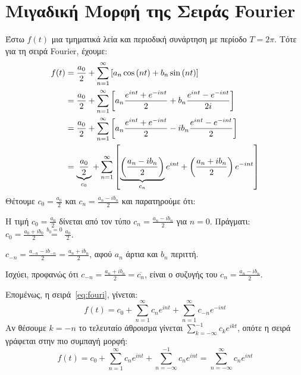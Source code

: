 \documentclass[a4paper,table]{report}
\begin{document}
      \section{Μιγαδική Μορφή της Σειράς Fourier}



      Έστω $f(t)$ μια τμηματικά λεία και περιοδική συνάρτηση με περίοδο $ T=2 \pi $. Τότε 
      για τη σειρά Fourier, έχουμε:
      \begin{align}
        \label{eq:fouri}
        f(t) &= \frac{a_{0}}{2} + \sum_{n=1}^{\infty} \left[a_{n} \cos{(nt)} + b_{n} \sin{(nt)}\right] \notag \\
             &= \frac{a_{0}}{2} + \sum_{n=1}^{\infty} \left[a_{n} \frac{e^{int}+e^{-int}}{2} + b_{n} \frac{e^{int}-e^{-int}}{2i} \right] \notag \\
             &= \frac{a_{0}}{2} + \sum_{n=1}^{\infty} \left[a_{n} \frac{e^{int}+e^{-int}}{2} - i b_{n} \frac{e^{int}-e^{-int}}{2}\right] \notag \\
             &= \underbrace{\frac{a_{0}}{2}}_{c_{0}} + \sum_{n=1}^{\infty} \left[\underbrace{\left(\frac{a_{n}-ib_{n}}{2}\right)}_{c_{n}}e^{int} +
             \left(\frac{a_{n}+ib_{n}}{2}\right) e^{-int}\right]
      \end{align}
      Θέτουμε $ c_{0} = \frac{a_{0}}{2} $ και $ c_{n} = \frac{a_{n}-ib_{n}}{2} $ και
      παρατηρούμε ότι:
      \begin{myitemize}
        \item Η τιμή $ c_{0} = \frac{a_{0}}{2} $ δίνεται από τον τύπο $ c_{n} =
          \frac{a_{n}- ib_{n}}{2} $ για $ n=0 $. Πράγματι: 
          $ c_{0} = \frac{a_{0}+ib_{0}}{2} \overset{b_{0}=0}{=} \frac{a_{0}}{2}$.
        \item 
          $ c_{-n} = \frac{a_{-n}-ib_{-n}}{2} = \frac{a_{n}+ib_{n}}{2} $, αφού 
          $ a_{n} $ άρτια και $ b_{n} $ περιττή.
        \item Ισχύει, προφανώς ότι $ c_{-n} = \frac{a_{n}+ib_{n}}{2} = \overline{c_{n}}
          $, είναι ο συζυγής του $ c_{n} = \frac{a_{n}-i b_{n}}{2} $.
      \end{myitemize}
      Επομένως, η σειρά~\eqref{eq:fouri}, γίνεται:
      \[
        f(t) = c_{0} + \sum_{n=1}^{\infty} c_{n} e^{int} + \sum_{n=1}^{\infty} c_{-n}
        e^{-int} 
      \] 
      Αν θέσουμε $ k=-n $ το τελευταίο άθροισμα γίνεται $ \sum_{k=-\infty}^{-1} c_{k}
      e^{ikt} $, οπότε η σειρά γράφεται στην πιο συμπαγή μορφή:
      \[
        f(t) = c_{0} + \sum_{n=1}^{\infty} c_{n} e^{int} + \sum_{n=-\infty}^{-1} c_{n}
        e^{int} = \sum_{n=- \infty}^{\infty} c_{n} e^{int}
      \]
\end{document}
